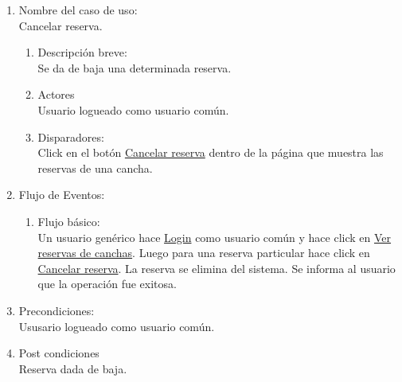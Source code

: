 \documentclass[a4paper,11pt]{article}
\begin{document}
\begin{enumerate}

    \item Nombre del caso de uso: \\
    Cancelar reserva.

    \begin{enumerate}
    \item Descripción breve: \\
        Se da de baja una determinada reserva.
    \item Actores \\
        Usuario logueado como usuario común.
    \item Disparadores: \\
        Click en el botón \underline{Cancelar reserva} dentro de la
        página que muestra las reservas de una cancha.
    \end{enumerate}

    \item Flujo de Eventos: \\

    \begin{enumerate}

        \item Flujo básico:\\
            Un usuario genérico hace \underline{Login} como usuario común y
            hace click en \underline{Ver reservas de canchas}. Luego para una
            reserva particular hace click en \underline{Cancelar reserva}.
            La reserva se elimina del sistema. Se informa al usuario que la
            operación fue exitosa.

    \end{enumerate}

    \item Precondiciones: \\
        Ususario logueado como usuario común.

    \item Post condiciones \\
        Reserva dada de baja.

\end{enumerate}
\end{document}
